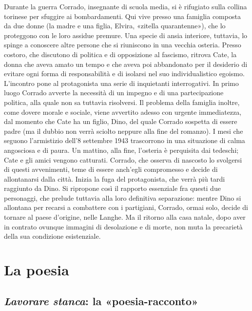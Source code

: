 Durante la guerra Corrado, insegnante di scuola media, si è rifugiato sulla collina torinese per sfuggire ai bombardamenti. Qui vive presso una famiglia composta da due donne (la madre e una figlia, Elvira, «zitella quarantenne»), che lo proteggono con le loro assidue premure. Una specie di ansia interiore, tuttavia, lo spinge a conoscere altre persone che si riuniscono in una vecchia osteria. Presso costoro, che discutono di politica e di opposizione al fascismo, ritrova Cate, la donna che aveva amato un tempo e che aveva poi abbandonato per il desiderio di evitare ogni forma di responsabilità e di isolarsi nel suo individualistico egoismo. L'incontro pone al protagonista una serie di inquietanti interrogativi. In primo luogo Corrado avverte la necessità di un impegno e di una partecipazione politica, alla quale non sa tuttavia risolversi. Il problema della famiglia inoltre, come dovere morale e sociale, viene avvertito adesso con urgente immediatezza, dal momento che Cate ha un figlio, Dino, del quale Corrado sospetta di essere padre (ma il dubbio non verrà sciolto neppure alla fine del romanzo). I mesi che seguono l'armistizio dell'8 settembre 1943 trascorrono in una situazione di calma angosciosa e di paura. Un mattino, alla fine, l'osteria è perquisita dai tedeschi; Cate e gli amici vengono catturati. Corrado, che osserva di nascosto lo svolgersi di questi avvenimenti, teme di essere anch'egli compromesso e decide di allontanarsi dalla città. Inizia la fuga del protagonista, che verrà più tardi raggiunto da Dino. Si ripropone così il rapporto essenziale fra questi due personaggi, che prelude tuttavia alla loro definitiva separazione: mentre Dino si allontana per recarsi a combattere con i partigiani, Corrado, ormai solo, decide di tornare al paese d'origine, nelle Langhe. Ma il ritorno alla casa natale, dopo aver in contrato ovunque immagini di desolazione e di morte, non muta la precarietà della sua condizione esistenziale.

\section{La poesia}

\subsection{\textit{Lavorare stanca}: la «poesia-racconto»}

